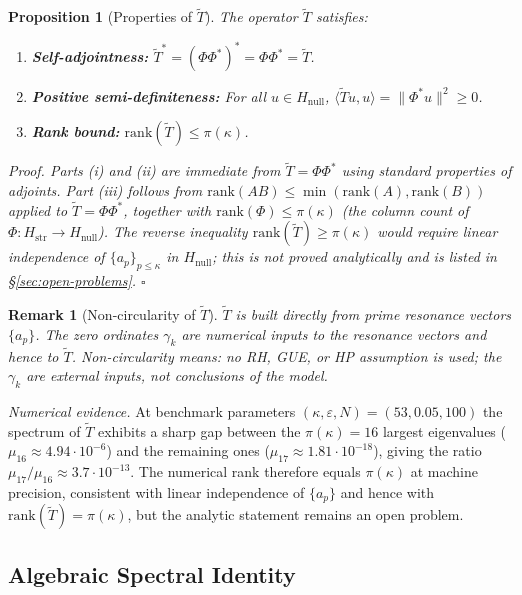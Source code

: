 \documentclass[11pt]{article}
\newtheorem{proposition}[theorem]{Proposition}
\newtheorem*{remark}{Remark}
\newcommand{\Hstr}{H_{\mathrm{str}}}
\newcommand{\Hnull}{H_{\mathrm{null}}}
\newcommand{\Tt}{\widetilde{T}}
\begin{document}
\begin{proposition}[Properties of $\Tt$]\label{prop:Tt-properties}
The operator $\Tt$ satisfies:
\begin{enumerate}[label=(\roman*)]
	\item \textbf{Self-adjointness:}
	$\Tt^* = (\Phi\Phi^*)^* = \Phi\Phi^* = \Tt$.
	\item \textbf{Positive semi-definiteness:}
	For all $u\in\Hnull$,
	$\langle\Tt u,u\rangle = \|\Phi^* u\|^2 \geq 0$.
	\item \textbf{Rank bound:}
	$\mathrm{rank}(\Tt) \leq \pi(\kappa)$.
\end{enumerate}
\emph{Proof.}
Parts (i) and (ii) are immediate from $\Tt=\Phi\Phi^*$ using standard
properties of adjoints.
Part (iii) follows from
$\mathrm{rank}(AB)\leq\min(\mathrm{rank}(A),\mathrm{rank}(B))$
applied to $\Tt=\Phi\Phi^*$, together with $\mathrm{rank}(\Phi)\leq\pi(\kappa)$
(the column count of $\Phi\colon\Hstr\to\Hnull$).
The reverse inequality $\mathrm{rank}(\Tt)\geq\pi(\kappa)$ would require
linear independence of $\{a_p\}_{p\leq\kappa}$ in $\Hnull$; this is
not proved analytically and is listed in \S\ref{sec:open-problems}.
$\square$
\end{proposition}

\begin{remark}[Non-circularity of $\Tt$]
$\Tt$ is built directly from prime resonance vectors $\{a_p\}$.
The zero ordinates $\gamma_k$ are numerical inputs to the resonance
vectors and hence to $\Tt$.
Non-circularity means: no RH, GUE, or HP assumption is used; the
$\gamma_k$ are external inputs, not conclusions of the model.
\end{remark}

\emph{Numerical evidence.} At benchmark parameters
$(\kappa,\varepsilon,N)=(53,0.05,100)$ the spectrum of $\Tt$ exhibits
a sharp gap between the $\pi(\kappa)=16$ largest eigenvalues
($\mu_{16}\approx 4.94\cdot 10^{-6}$) and the remaining ones
($\mu_{17}\approx 1.81\cdot 10^{-18}$), giving the ratio
$\mu_{17}/\mu_{16}\approx 3.7\cdot 10^{-13}$. The numerical rank
therefore equals $\pi(\kappa)$ at machine precision, consistent
with linear independence of $\{a_p\}$ and hence with
$\mathrm{rank}(\Tt)=\pi(\kappa)$, but the analytic statement remains
an open problem.

\subsection{Algebraic Spectral Identity}
\end{document}
